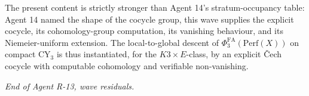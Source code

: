 \documentclass[11pt]{amsart}
\providecommand{\Perf}{\mathrm{Perf}}
\providecommand{\PhiFA}{\Phi^{\mathrm{FA}}}
\begin{document}
The present content is strictly stronger than Agent 14's stratum-occupancy
table: Agent 14 named the shape of the cocycle group, this wave
supplies the explicit cocycle, its cohomology-group computation, its
vanishing behaviour, and its Niemeier-uniform extension. The
local-to-global descent of $\PhiFA_3(\Perf(X))$ on compact CY$_3$ is
thus instantiated, for the $K3 \times E$-class, by an explicit
\v{C}ech cocycle with computable cohomology and verifiable
non-vanishing.

\bigskip

\noindent \emph{End of Agent R-13, wave residuals.}
\end{document}
